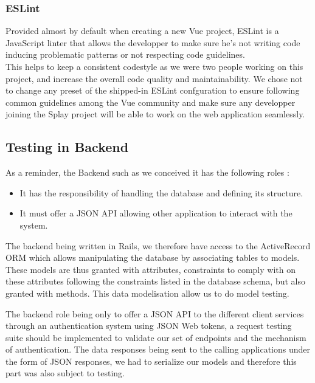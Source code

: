 \documentclass{eplmastersthesis}
\begin{document}
        \subsubsection{ESLint}

          Provided almost by default when creating a new Vue project, ESLint
          \cite{eslint} is a JavaScript linter that allows the developper to
          make sure he's not writing code inducing problematic patterns or not
          respecting code guidelines.\\
          This helps to keep a consistent codestyle as we were two people working
          on this project, and increase the overall code quality and
          maintainability. We chose not to change any preset of the shipped-in
          ESLint confguration to ensure following common guidelines among the Vue
          community and make sure any developper joining the Splay project will
          be able to work on the web application seamlessly.


      \subsection{Testing in Backend}

        As a reminder, the Backend such as we conceived it has the following
        roles :

        \begin{itemize}
          \item It has the responsibility of handling the database and
          defining its structure.
          \item It must offer a JSON API allowing other application to interact
          with the system.
        \end{itemize}

        The backend being written in Rails, we therefore have access to the
        ActiveRecord ORM which allows manipulating the database by associating
        tables to models. These models are thus granted with attributes,
        constraints to comply with on these attributes following the constraints
        listed in the database schema, but also granted with methods. This data
        modelisation allow us to do model testing.

        The backend role being only to offer a JSON API to the different client
        services through an authentication system using JSON Web tokens, a
        request testing suite should be implemented to validate our set of
        endpoints and the mechanism of authentication.
        The data responses being sent to the calling applications under the form
        of JSON responses, we had to serialize our models and therefore this
        part was also subject to testing.
\end{document}
